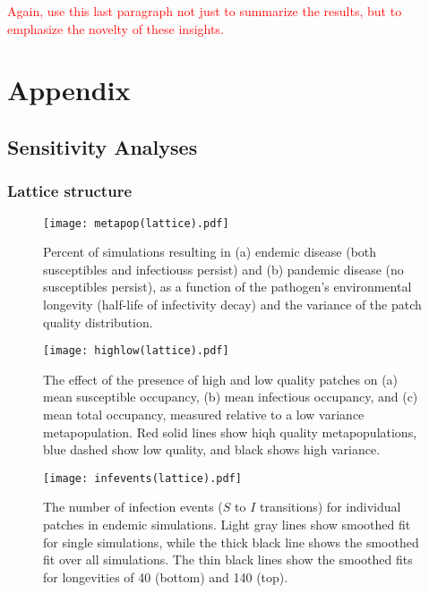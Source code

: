 \documentclass{svjour3}
\begin{document}
\textcolor{red}{Again, use this last paragraph not just to summarize the results, but to emphasize the novelty of these insights.}

\clearpage

\section{Appendix}

\subsection{Sensitivity Analyses}

\subsubsection{Lattice structure}

\begin{figure}[h!]
\centering
\texttt{[image: metapop(lattice).pdf]}
\caption{Percent of simulations resulting in (a) endemic disease (both susceptibles and infectiouss persist) and (b) pandemic disease (no susceptibles persist), as a function of the pathogen's environmental longevity (half-life of infectivity decay) and the variance of the patch quality distribution.}
\label{poutcome_lattice}
\end{figure}   

\begin{figure}
\centering
\texttt{[image: highlow(lattice).pdf]}
\caption{The effect of the presence of high and low quality patches on (a) mean susceptible occupancy, (b) mean infectious occupancy, and (c) mean total occupancy, measured relative to  a low variance metapopulation.  Red solid lines show hiqh quality metapopulations, blue dashed show low quality, and black shows high variance.}
\label{sens_lattice}
\end{figure}

\begin{figure}
\centering
\texttt{[image: infevents(lattice).pdf]}
\caption{The number of infection events ($S$ to $I$ transitions) for individual patches in endemic simulations.  Light gray lines show smoothed fit for single simulations, while the thick black line shows the smoothed fit over all simulations.  The thin black lines show the smoothed fits for longevities of 40 (bottom) and 140 (top).}
\label{infections_lattice}
\end{figure}
\end{document}
